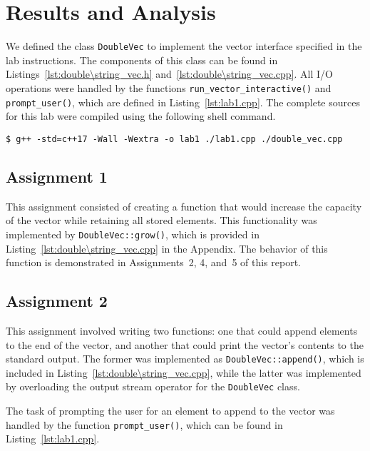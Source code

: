 \documentclass[11pt, letterpaper]{article} %
\begin{document}
\section*{Results and Analysis}

We defined the class \texttt{DoubleVec} to implement the vector interface specified in the lab instructions. The components of this class can be found in Listings~\ref{lst:double\string_vec.h} and~\ref{lst:double\string_vec.cpp}. All I/O operations were handled by the functions \texttt{run\_vector\_interactive()} and \texttt{prompt\_user()}, which are defined in Listing~\ref{lst:lab1.cpp}. The complete sources for this lab were compiled using the following shell command.
\begin{lstlisting}[style=labreportstyle-sh]
$ g++ -std=c++17 -Wall -Wextra -o lab1 ./lab1.cpp ./double_vec.cpp
\end{lstlisting}



\subsection*{Assignment 1}

This assignment consisted of creating a function that would increase the capacity of the vector while retaining all stored elements. This functionality was implemented by \texttt{DoubleVec::grow()}, which is provided in Listing~\ref{lst:double\string_vec.cpp} in the Appendix. The behavior of this function is demonstrated in Assignments~2, 4, and~5 of this report.

\subsection*{Assignment 2}

This assignment involved writing two functions: one that could append elements to the end of the vector, and another that could print the vector's contents to the standard output. The former was implemented as \texttt{DoubleVec::append()}, which is included in Listing~\ref{lst:double\string_vec.cpp}, while the latter was implemented by overloading the output stream operator for the \texttt{DoubleVec} class. 


The task of prompting the user for an element to append to the vector was handled by the function \texttt{prompt\_user()}, which can be found in Listing~\ref{lst:lab1.cpp}.
\end{document}
